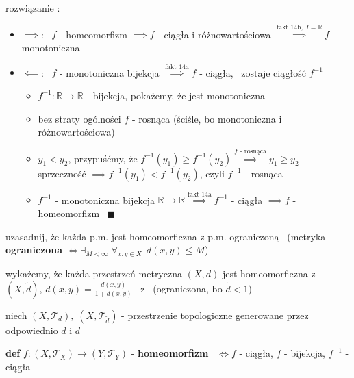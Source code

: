 \documentclass[a4paper,12pt]{article}
\begin{document}
\bigskip
rozwiązanie :
\begin{itemize}
    \item \(\implies\): \, \(f\) - homeomorfizm \(\implies f\) - ciągła i różnowartościowa \(\overset{\text{fakt 14b}, \; I = \mathbb{R}}{\implies} f\) - monotoniczna
    \item \(\impliedby\): \, \(f\) - monotoniczna bijekcja \(\overset{\text{fakt 14a}}{\implies} f\) - ciągła, \, zostaje ciągłość \(f^{-1}\)
    \begin{itemize}
        \item \(f^{-1}: \mathbb{R} \to \mathbb{R}\) - bijekcja, pokażemy, że jest monotoniczna
        \item bez straty ogólności \(f\) - rosnąca (ściśle, bo monotoniczna i różnowartościowa)
        \item \(y_1 < y_2\), \; przypuśćmy, że \(f^{-1}(y_1) \geq f^{-1}(y_2) \overset{f \text{ - rosnąca}}{\implies} y_1 \geq y_2\) \, - sprzeczność \(\implies f^{-1}(y_1) < f^{-1}(y_2)\), czyli \(f^{-1}\) - rosnąca
        \item \(f^{-1}\) - monotoniczna bijekcja \(\mathbb{R} \to \mathbb{R} \overset{\text{fakt 14a}}{\implies} f^{-1}\) - ciągła \(\implies f\) - homeomorfizm \, \(\blacksquare\)
    \end{itemize}
\end{itemize}

\newpage
{}

\bigskip
{} \; uzasadnij, że każda p.m. jest homeomorficzna z p.m. ograniczoną \, (metryka - \textbf{ograniczona} \(\iff \exists_{M < \infty} \; \forall_{x, y \in X} \;\, d(x, y) \leq M\))

\smallskip
wykażemy, że każda przestrzeń metryczna \((X, d)\) jest homeomorficzna z \((X, \tilde{d})\), \; \(\tilde{d}(x, y) = \frac{d(x, y)}{1 + d(x, y)}\) \, z  \, (ograniczona, bo \(\tilde{d} < 1\))

niech \((X, \mathcal{T}_d), \; (X, \mathcal{T}_{\tilde{d}})\) - przestrzenie topologiczne generowane przez odpowiednio \(d\) i \(\tilde{d}\)

\smallskip
\textbf{def} \; \(f: (X, \mathcal{T}_X) \to (Y, \mathcal{T}_Y)\) - \textbf{homeomorfizm} \, \(\iff f\) - ciągła, \; \(f\) - bijekcja, \; \(f^{-1}\) - ciągła
\end{document}
